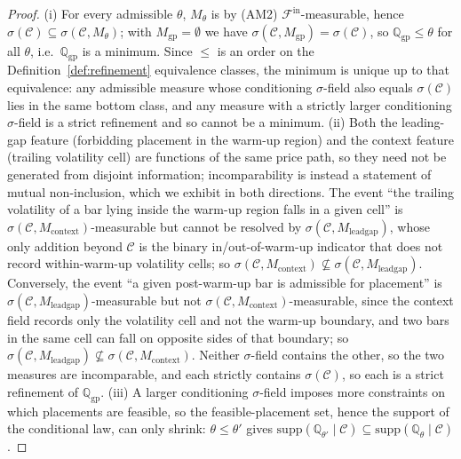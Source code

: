 \documentclass[preprint,12pt]{elsarticle}
\theoremstyle{definition}
\begin{document}
\begin{proof}
(i) For every admissible $\theta$, $M_\theta$ is by (AM2)
$\mathcal F^{\mathrm{in}}$-measurable, hence
$\sigma(\mathcal C)\subseteq\sigma(\mathcal C,M_\theta)$; with
$M_{\mathrm{gp}}=\emptyset$ we have $\sigma(\mathcal C,M_{\mathrm{gp}})=
\sigma(\mathcal C)$, so $\mathbb{Q}_{\mathrm{gp}}\le\theta$ for all $\theta$, i.e.\
$\mathbb{Q}_{\mathrm{gp}}$ is a minimum. Since $\le$ is an order on the
Definition~\ref{def:refinement} equivalence classes, the minimum is unique up to
that equivalence: any admissible measure whose conditioning $\sigma$-field also
equals $\sigma(\mathcal C)$ lies in the same bottom class, and any measure with a
strictly larger conditioning $\sigma$-field is a strict refinement and so cannot be
a minimum. (ii) Both the leading-gap feature
(forbidding placement in the warm-up region) and the context feature (trailing
volatility cell) are functions of the same price path, so they need not be generated
from disjoint information; incomparability is instead a statement of mutual
non-inclusion, which we exhibit in both directions. The event ``the trailing
volatility of a bar lying inside the warm-up region falls in a given cell'' is
$\sigma(\mathcal C,M_{\mathrm{context}})$-measurable but cannot be resolved by
$\sigma(\mathcal C,M_{\mathrm{leadgap}})$, whose only addition beyond $\mathcal C$
is the binary in/out-of-warm-up indicator that does not record within-warm-up
volatility cells; so $\sigma(\mathcal C,M_{\mathrm{context}})\not\subseteq
\sigma(\mathcal C,M_{\mathrm{leadgap}})$. Conversely, the event ``a given
post-warm-up bar is admissible for placement'' is
$\sigma(\mathcal C,M_{\mathrm{leadgap}})$-measurable but not
$\sigma(\mathcal C,M_{\mathrm{context}})$-measurable, since the context field
records only the volatility cell and not the warm-up boundary, and two bars in the
same cell can fall on opposite sides of that boundary; so
$\sigma(\mathcal C,M_{\mathrm{leadgap}})\not\subseteq
\sigma(\mathcal C,M_{\mathrm{context}})$. Neither $\sigma$-field contains the other,
so the two measures are incomparable, and each strictly contains
$\sigma(\mathcal C)$, so each is a strict refinement of $\mathbb{Q}_{\mathrm{gp}}$. (iii) A larger conditioning $\sigma$-field imposes more
constraints on which placements are feasible, so the feasible-placement set, hence
the support of the conditional law, can only shrink: $\theta\le\theta'$ gives
$\mathrm{supp}(\mathbb{Q}_{\theta'}\mid\mathcal C)\subseteq
\mathrm{supp}(\mathbb{Q}_{\theta}\mid\mathcal C)$.
\end{proof}
\end{document}
